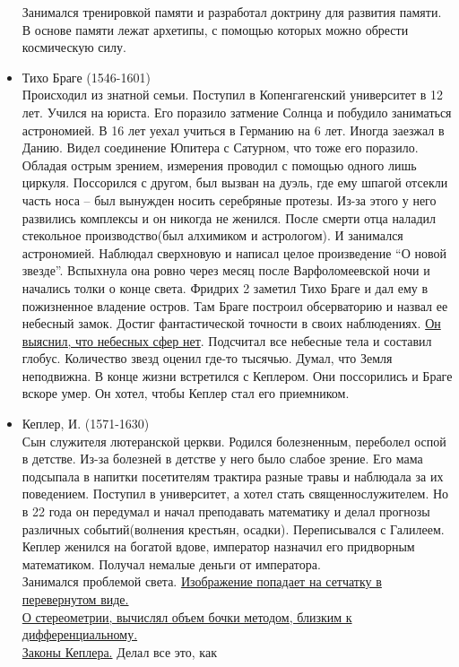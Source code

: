 \documentclass[a4paper,12pt]{report} %
\begin{document}
\begin{itemize}
  Занимался тренировкой памяти и разработал доктрину для развития
  памяти. В основе памяти лежат архетипы, с помощью которых можно
  обрести космическую силу.
\item Тихо Браге (1546-1601)\\
  Происходил из знатной семьи. Поступил в Копенгагенский университет в
  12 лет. Учился на юриста. Его поразило затмение Солнца и побудило
  заниматься астрономией. В 16 лет уехал учиться в Германию на 6
  лет. Иногда заезжал в Данию. Видел соединение Юпитера с Сатурном, что
  тоже его поразило. Обладая острым зрением, измерения проводил с
  помощью одного лишь циркуля. Поссорился с другом, был вызван на дуэль,
  где ему шпагой отсекли часть носа -- был вынужден носить серебряные
  протезы. Из-за этого у него развились комплексы и он никогда не
  женился. После смерти отца наладил стекольное производство(был
  алхимиком и астрологом). И занимался астрономией. Наблюдал сверхновую
  и написал целое произведение ``О новой звезде''. Вспыхнула она ровно
  через месяц после Варфоломеевской ночи и начались толки о конце
  света. Фридрих 2 заметил Тихо Браге и дал ему в пожизненное владение
  остров. Там Браге построил обсерваторию и назвал ее небесный
  замок. Достиг фантастической точности в своих наблюдениях. \underline{Он выяснил,
    что небесных сфер нет}. Подсчитал все небесные тела и составил
  глобус. Количество звезд оценил где-то тысячью. Думал, что Земля
  неподвижна. В конце жизни встретился с Кеплером. Они поссорились и
  Браге вскоре умер. Он хотел, чтобы Кеплер стал его приемником.
\item Кеплер, И. (1571-1630)\\
  Сын служителя лютеранской церкви. Родился болезненным, переболел оспой
  в детстве. Из-за болезней в детстве у него было слабое зрение. Его
  мама подсыпала в напитки посетителям трактира разные травы и наблюдала
  за их поведением. Поступил в университет, а хотел стать
  священнослужителем. Но в 22 года он передумал и начал преподавать
  математику и делал прогнозы различных событий(волнения крестьян,
  осадки). Переписывался с Галилеем. Кеплер женился на богатой вдове,
  император назначил его придворным математиком. Получал немалые деньги
  от императора.\\
  Занимался проблемой света. \underline{Изображение попадает на сетчатку в
    перевернутом виде.}\\ \underline{О стереометрии, вычислял объем бочки методом,
    близким к дифференциальному.}\\ \underline{Законы Кеплера.} Делал все это, как

\end{itemize}
\end{document}
